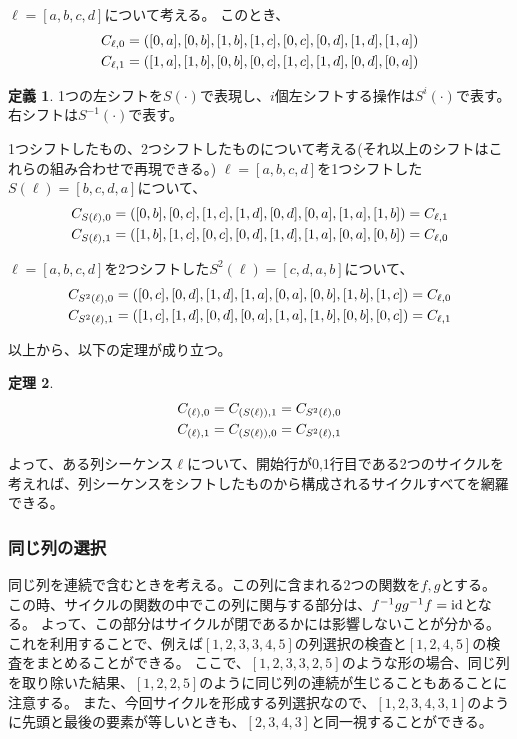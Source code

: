 \documentclass[a4paper,11pt,dvipdfmx]{jsarticle}
\theoremstyle{definition}
\newtheorem{definition}{定義}[section]
\newtheorem{theorem}[definition]{定理}
\begin{document}
$\ell=[a,b,c,d]$について考える。
このとき、
\begin{align}
  C_{{\ell},{0}}=([0,a],[0,b],[1,b],[1,c],[0,c],[0,d],[1,d],[1,a])\\
  C_{{\ell},{1}}=([1,a],[1,b],[0,b],[0,c],[1,c],[1,d],[0,d],[0,a])
\end{align}

\begin{definition}
  1つの左シフトを$S(\cdot)$で表現し、$i$個左シフトする操作は$S^i(\cdot)$で表す。右シフトは$S^{-1}(\cdot)$で表す。
\end{definition}

1つシフトしたもの、2つシフトしたものについて考える(それ以上のシフトはこれらの組み合わせで再現できる。)
$\ell=[a,b,c,d]$を1つシフトした$S(\ell)=[b,c,d,a]$について、
\begin{align}
  C_{{S(\ell)},{0}}=([0,b],[0,c],[1,c],[1,d],[0,d],[0,a],[1,a],[1,b])=C_{{\ell},{1}}\\
  C_{{S(\ell)},{1}}=([1,b],[1,c],[0,c],[0,d],[1,d],[1,a],[0,a],[0,b])=C_{{\ell},{0}}
\end{align}

$\ell=[a,b,c,d]$を2つシフトした$S^2(\ell)=[c,d,a,b]$について、
\begin{align}
  C_{{S^2(\ell)},{0}}=([0,c],[0,d],[1,d],[1,a],[0,a],[0,b],[1,b],[1,c])=C_{{\ell},{0}}\\
  C_{{S^2(\ell)},{1}}=([1,c],[1,d],[0,d],[0,a],[1,a],[1,b],[0,b],[0,c])=C_{{\ell},{1}}
\end{align}

以上から、以下の定理が成り立つ。
\begin{theorem}\label{th:same_cycle}
  \begin{align}
    C_{{(\ell)},{0}} = C_{{(S(\ell))},{1}} = C_{{S^2(\ell)},{0}}\\
    C_{{(\ell)},{1}} = C_{{(S(\ell))},{0}} = C_{{S^2(\ell)},{1}}\\
  \end{align}
\end{theorem}
よって、ある列シーケンス$\ell$について、開始行が0,1行目である2つのサイクルを考えれば、列シーケンスをシフトしたものから構成されるサイクルすべてを網羅できる。

\subsubsection{同じ列の選択}\label{para:samecol}
同じ列を連続で含むときを考える。この列に含まれる2つの関数を$f,g$とする。
この時、サイクルの関数の中でこの列に関与する部分は、$f^{-1} gg^{-1} f=\text{id}$となる。
よって、この部分はサイクルが閉であるかには影響しないことが分かる。
これを利用することで、例えば$[1,2,3,3,4,5]$の列選択の検査と$[1,2,4,5]$の検査をまとめることができる。
ここで、$[1,2,3,3,2,5]$のような形の場合、同じ列を取り除いた結果、$[1,2,2,5]$のように同じ列の連続が生じることもあることに注意する。
また、今回サイクルを形成する列選択なので、$[1,2,3,4,3,1]$のように先頭と最後の要素が等しいときも、$[2,3,4,3]$と同一視することができる。
\end{document}

